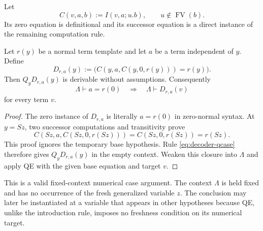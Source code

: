 Let
\[
 C(v,a,b):=I(v,a;u.b),\qquad u\notin\operatorname{FV}(b).
\]
Its zero equation is definitional and its successor equation is a direct
instance of the remaining computation rule.

\begin{lemma}
\label{lem:case-decoder}
Let $r(y)$ be a normal term template and let $a$ be a term independent of
$y$.  Define
\[
 D_{r,a}(y):=
 \bigl(C(y,a,C(y,0,r(y)))=r(y)\bigr).
\]
Then $Q_yD_{r,a}(y)$ is derivable without assumptions.  Consequently
\[
 \Lambda\vdash a=r(0)
 \quad\Longrightarrow\quad
 \Lambda\vdash D_{r,a}(v)
\]
for every term $v$.
\end{lemma}
\begin{proof}
The zero instance of $D_{r,a}$ is literally $a=r(0)$ in zero-normal
syntax.  At $y=Sz$, two successor computations and transitivity prove
\[
 C(Sz,a,C(Sz,0,r(Sz)))
   =C(Sz,0,r(Sz))=r(Sz).
\]
This proof ignores the temporary base hypothesis.  Rule
\eqref{eq:decoder-qcase} therefore gives $Q_yD_{r,a}(y)$ in the empty
context.  Weaken this closure into $\Lambda$ and apply QE with the
given base equation and target $v$.
\end{proof}

This is a valid fixed-context numerical case argument.  The context
$\Lambda$ is held fixed and has no occurrence of the fresh generalized
variable $z$.  The conclusion may later be instantiated at a variable
that appears in other hypotheses because QE, unlike the introduction
rule, imposes no freshness condition on its numerical target.

